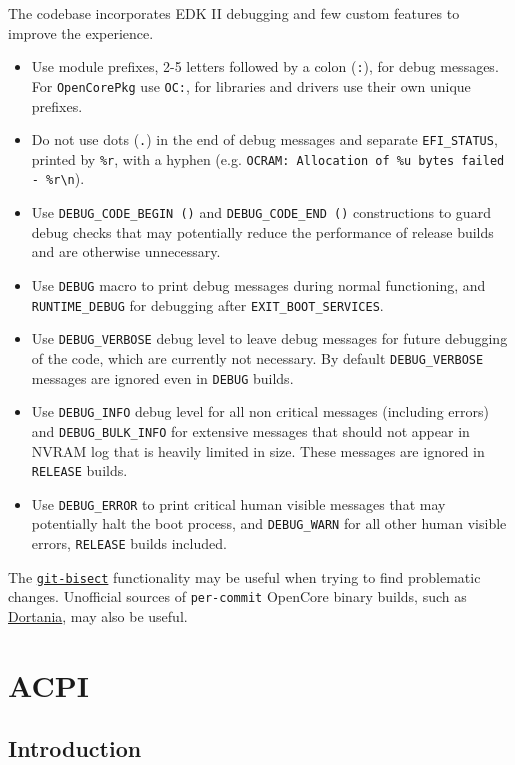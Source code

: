 \documentclass[]{article}
\makeatletter
\providecommand{\tightlist}{%
  \setlength{\itemsep}{0pt}\setlength{\parskip}{0pt}}
\renewcommand{\label}[1]{%
\zref@wrapper@immediate{\oldlabel{#1}}}  %
\makeatother
\begin{document}
The codebase incorporates EDK II debugging and few custom features to improve the experience.
\begin{itemize}
\tightlist
\item Use module prefixes, 2-5 letters followed by a colon (\texttt{:}), for debug messages. For \texttt{OpenCorePkg}
use \texttt{OC:}, for libraries and drivers use their own unique prefixes.
\item Do not use dots (\texttt{.}) in the end of debug messages and separate \texttt{EFI\_STATUS}, printed by
\texttt{\%r}, with a hyphen (e.g. \texttt{OCRAM: Allocation of \%u bytes failed - \%r\textbackslash n}).
\item Use \texttt{DEBUG\_CODE\_BEGIN ()} and \texttt{DEBUG\_CODE\_END ()} constructions to guard debug checks
that may potentially reduce the performance of release builds and are otherwise unnecessary.
\item Use \texttt{DEBUG} macro to print debug messages during normal functioning, and \texttt{RUNTIME\_DEBUG} for
debugging after \texttt{EXIT\_BOOT\_SERVICES}.
\item Use \texttt{DEBUG\_VERBOSE} debug level to leave debug messages for future debugging of the code, which
are currently not necessary. By default \texttt{DEBUG\_VERBOSE} messages are ignored even in \texttt{DEBUG} builds.
\item Use \texttt{DEBUG\_INFO} debug level for all non critical messages (including errors)
and \texttt{DEBUG\_BULK\_INFO}
for extensive messages that should not appear in NVRAM log that is heavily limited in size.
These messages are ignored in \texttt{RELEASE} builds.
\item Use \texttt{DEBUG\_ERROR} to print critical human visible messages that may potentially halt the boot process,
and \texttt{DEBUG\_WARN} for all other human visible errors, \texttt{RELEASE} builds included.
\end{itemize}

The \href{https://git-scm.com/docs/git-bisect}{\texttt{git-bisect}} functionality may be useful when trying
to find problematic changes. Unofficial sources of \texttt{per-commit} OpenCore binary builds,
such as \href{https://dortania.github.io/builds}{Dortania}, may also be useful.

\section{ACPI}\label{acpi}

\subsection{Introduction}\label{acpiintro}
\end{document}
